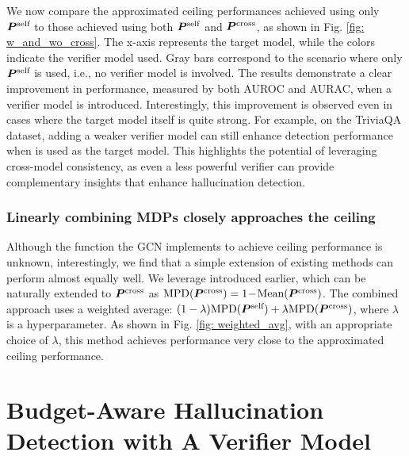 We now compare the approximated ceiling performances achieved using only ${\bm{P}}^{\text{self}}$ to those achieved using both ${\bm{P}}^{\text{self}}$ and ${\bm{P}}^{\text{cross}}$, as shown in Fig. \ref{fig: w_and_wo_cross}. The x-axis represents the target model, while the colors indicate the verifier model used. Gray bars correspond to the scenario where only ${\bm{P}}^{\text{self}}$ is used, i.e., no verifier model is involved. The results demonstrate a clear improvement in performance, measured by both AUROC and AURAC, when a verifier model is introduced. Interestingly, this improvement is observed even in cases where the target model itself is quite strong. For example, on the TriviaQA dataset, adding a weaker verifier model can still enhance detection performance when \llamathreeseventy{} is used as the target model. This highlights the potential of leveraging cross-model consistency, as even a less powerful verifier can provide complementary insights that enhance hallucination detection.


\subsubsection{Linearly combining MDPs closely approaches the ceiling}\label{sec:weighting}


Although the function the GCN implements to achieve ceiling performance is unknown, interestingly, we find that a simple extension of existing methods can perform almost equally well. We leverage \mpd{} introduced earlier, which can be naturally extended to ${\bm{P}}^{\text{cross}}$ as $\text{MPD}({\bm{P}}^{\text{cross}}) = 1 \!- \!\text{Mean}({\bm{P}}^{\text{cross}})$. The combined approach uses a weighted average: $(1-\lambda) \text{MPD}({\bm{P}}^{\text{self}}) + \lambda \text{MPD}({\bm{P}}^{\text{cross}})$, where $\lambda$ is a hyperparameter. As shown in Fig. \ref{fig: weighted_avg}, with an appropriate choice of $\lambda$, this method achieves performance very close to the approximated ceiling performance. 



\section{Budget-Aware Hallucination Detection with A Verifier Model  }\label{sec: method}



